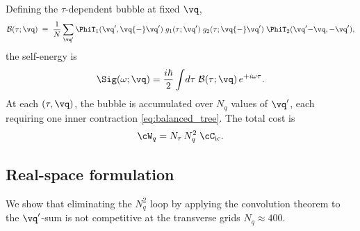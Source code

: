 Defining the $\tau$-dependent bubble at fixed $\vq$,
\begin{equation}
  \mathcal{B}(\tau;\vq)
  \;\equiv\;
  \frac{1}{N}\sum_{\vq'}
  \PhiT_1(\vq',\vq{-}\vq')\;
  g_1(\tau;\vq')\;
  g_2(\tau;\vq{-}\vq')\;
  \PhiT_2(\vq'{-}\vq,-\vq'),
  \label{eq:bubble_q}
\end{equation}
the self-energy is
\begin{equation}
  \Sig(\omega;\vq)
  = \frac{i\hbar}{2}
    \int\!d\tau\;
    \mathcal{B}(\tau;\vq)\,e^{+i\omega\tau}.
  \label{eq:sigma_q}
\end{equation}
At each $(\tau,\vq)$, the bubble is accumulated over $N_q$ values
of $\vq'$, each requiring one inner contraction
\cref{eq:balanced_tree}.  The total cost is
\begin{equation}
  \cW_q = N_\tau\,N_q^2\;\cC_\mathrm{ic}.
  \label{eq:cost_q}
\end{equation}


\subsection{Real-space formulation}
\label{sub:real_space}

We show that eliminating the $N_q^2$ loop by applying the
convolution theorem to the $\vq'$-sum is not competitive at the transverse
grids $N_q \approx 400$.

